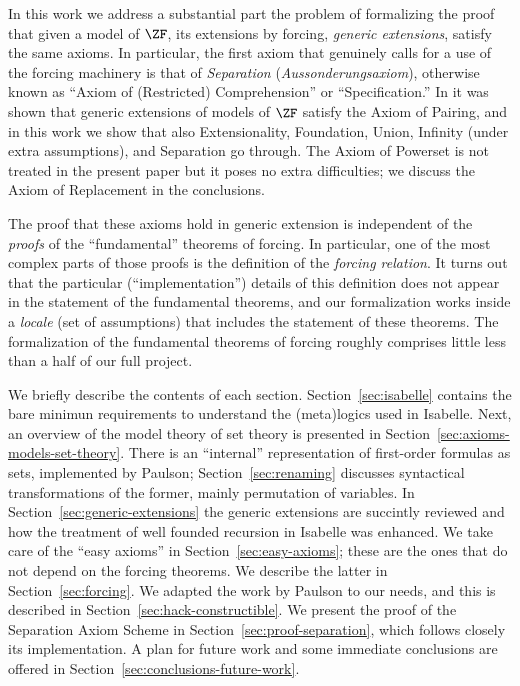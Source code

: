In this work we address a substantial part the problem of formalizing
the proof that given a model of $\ZF$, its extensions by forcing, 
\emph{generic extensions},
satisfy the same axioms. In particular, the first axiom that
genuinely calls for a use of the forcing machinery is that of
\emph{Separation} (\emph{Aussonderungsaxiom}), otherwise known as
``Axiom of (Restricted) Comprehension''  or ``Specification.'' In
\cite{2018arXiv180705174G} it was shown that  generic extensions of
models of $\ZF$ 
satisfy the Axiom of Pairing, and in this work we show that also
Extensionality, Foundation, Union, Infinity (under extra assumptions),
and Separation go through. The
Axiom of Powerset is not treated in the present paper but it poses no
extra difficulties; we discuss the Axiom of Replacement in the
conclusions. 

The proof that these axioms hold in generic extension is independent
of the \emph{proofs} of the ``fundamental'' theorems of forcing. In
particular, one of the most complex parts of those proofs is the
definition of the \emph{forcing relation}. It turns out that the
particular (``implementation'') details of this  definition  does not
appear in the statement of the fundamental theorems, and our
formalization works inside a \emph{locale} (set of assumptions) that
includes the statement of these theorems. The formalization of the
fundamental theorems of forcing roughly comprises little less than a
half of our full project. 

We briefly describe the contents of each
section. Section~\ref{sec:isabelle} contains the bare minimun
requirements to understand the (meta)logics used in Isabelle. Next, an
overview of the model theory of set theory is presented in
Section~\ref{sec:axioms-models-set-theory}. There is an ``internal''
representation of first-order formulas as sets, implemented by
Paulson; Section~\ref{sec:renaming} discusses syntactical
transformations of the former, mainly permutation of variables. 
In Section~\ref{sec:generic-extensions} the generic extensions are
succintly reviewed and how the treatment of well founded recursion in
Isabelle was enhanced. We take care of the ``easy axioms'' in
Section~\ref{sec:easy-axioms}; these are the ones that
do not depend on the forcing theorems. We describe the latter in
Section~\ref{sec:forcing}. We adapted the  work by Paulson to our
needs, and this is described in
Section~\ref{sec:hack-constructible}. We present the proof
of the Separation Axiom Scheme in Section~\ref{sec:proof-separation},
which follows closely its implementation. A plan for future work and
some immediate conclusions are offered in
Section~\ref{sec:conclusions-future-work}.

